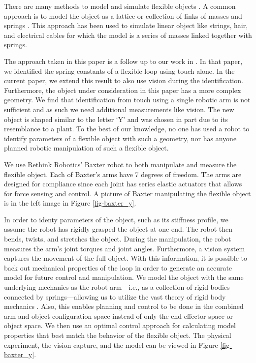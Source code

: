 \documentclass[runningheads,a4paper]{llncs}
\begin{document}
There are many methods to model and simulate flexible objects \cite{khalil_payeur,lang_etal}.  A common approach is to model the object as a lattice or collection of links of masses and springs \cite{sahari_etal,wakamatsu_etal,khalil_payeur}.  This approach has been used to simulate linear object like strings, hair, and electrical cables for which the model is a series of masses linked together with springs. %

The approach taken in this paper is a follow up to our work in \cite{caldwell_coleman_correll_iros}. In that paper, we identified the spring constants of a flexible loop using touch alone. In the current paper, we extend this result to also use vision during the identification. Furthermore, the object under consideration in this paper has a more complex geometry.  We find that identification from touch using a single robotic arm is not sufficient and as such we need additional measurements like vision.  The new object is shaped similar to the letter `Y' and was chosen in part due to its resemblance to a plant.  To the best of our knowledge, no one has used a robot to identify parameters of a flexible object with such a geometry, nor has anyone planned robotic manipulation of such a flexible object.

We use Rethink Robotics' Baxter \cite{guizzo2011rethink} robot to both manipulate and measure the flexible object.  Each of Baxter's arms have 7 degrees of freedom.  The arms are designed for compliance since each joint has series elastic actuators that allows for force sensing and control.  A picture of Baxter manipulating the flexible object is in the left image in Figure \ref{fig-baxter_y}.

In order to identy parameters of the object, such as its stiffness profile, we assume the robot has rigidly grasped the object at one end. The robot then bends, twists, and stretches the object.  During the manipulation, the robot measures the arm's joint torques and joint angles.  Furthermore, a vision system captures the movement of the full object.  With this information, it is possible to back out mechanical properties of the loop in order to generate an accurate model for future control and manipulation. We model the object with the same underlying mechanics as the robot arm---i.e., as a collection of rigid bodies connected by springs---allowing us to utilize the vast theory of rigid body mechanics \cite{murray_li_sastry}. Also, this enables planning and control to be done in the combined arm and object configuration space instead of only the end effector space or object space.  We then use an optimal control approach for calculating model properties that best match the behavior of the flexible object. The physical experiment, the vision capture, and the model can be viewed in Figure \ref{fig-baxter_y}.
\end{document}
